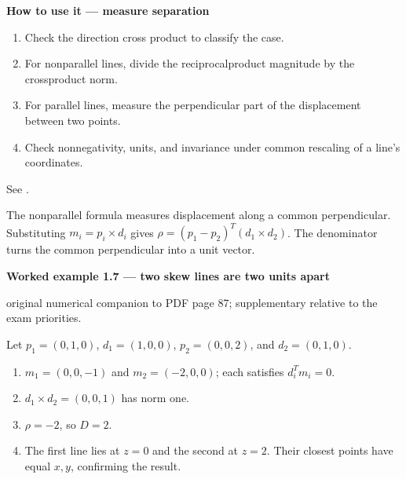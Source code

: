 \documentclass[letterpaper,11pt,english,openany,oneside]{jupyterBook}
\begin{document}
\begin{TextbookBox}
\textbf{How to use it — measure separation}\par\smallskip
\begin{enumerate}
%
\item {}
\sphinxAtStartPar
Check the direction cross product to classify the case.

\item {}
\sphinxAtStartPar
For nonparallel lines, divide the reciprocal\sphinxhyphen{}product magnitude by the cross\sphinxhyphen{}product norm.

\item {}
\sphinxAtStartPar
For parallel lines, measure the perpendicular part of the displacement between two points.

\item {}
\sphinxAtStartPar
Check nonnegativity, units, and invariance under common rescaling of a line’s coordinates.

\end{enumerate}

\sphinxAtStartPar
See {\hyperref[\detokenize{lectures/lecture01/planes-lines:ex-lec01-plucker}]{}}.

\end{TextbookBox}

\sphinxAtStartPar
The nonparallel formula measures displacement along a common perpendicular. Substituting \(m_i=p_i\times d_i\) gives \(\rho=(p_1-p_2)^T(d_1\times d_2)\). The denominator turns the common perpendicular into a unit vector.

\label{\detokenize{lectures/lecture01/planes-lines:ex-lec01-plucker}}
\begin{TextbookBox}
\textbf{Worked example 1.7 — two skew lines are two units apart}\par\smallskip

\sphinxAtStartPar
{} original numerical companion to PDF page 87; supplementary relative to the exam priorities.

\sphinxAtStartPar
Let \(p_1=(0,1,0)\), \(d_1=(1,0,0)\), \(p_2=(0,0,2)\), and \(d_2=(0,1,0)\).
\begin{enumerate}
%
\item {}
\sphinxAtStartPar
\(m_1=(0,0,-1)\) and \(m_2=(-2,0,0)\); each satisfies \(d_i^Tm_i=0\).

\item {}
\sphinxAtStartPar
\(d_1\times d_2=(0,0,1)\) has norm one.

\item {}
\sphinxAtStartPar
\(\rho=-2\), so \(D=2\).

\item {}
\sphinxAtStartPar
The first line lies at \(z=0\) and the second at \(z=2\). Their closest points have equal \(x,y\), confirming the result.

\end{enumerate}

\end{TextbookBox}
\end{document}
